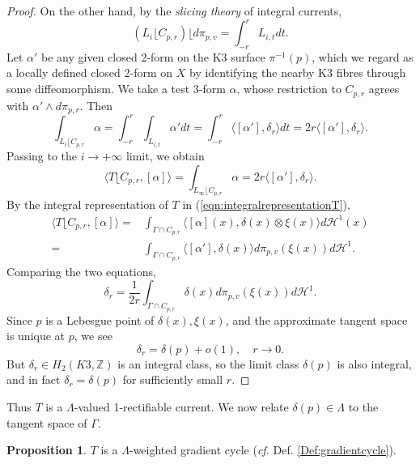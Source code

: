\documentclass{article}
\theoremstyle{definition}
\newtheorem{prop}[thm]{Proposition}
\newcommand{\cf}{\emph{cf.} }
\newcommand{\Z}{\mathbb{Z}}
\begin{document}
\begin{proof}
		On the other hand, by the \emph{slicing theory} of integral currents,
		\[
		(L_i \lfloor  C_{p,r} )  \lfloor  d\pi_{p,v}     = \int_{-r}^{r} 	L_{i,t} dt .
		\]
		Let $\alpha'$ be any given closed 2-form on the K3 surface $\pi^{-1}(p)$, which we regard as a locally defined closed 2-form  on $X$ by identifying the nearby K3 fibres through some diffeomorphism.
		We take a test 3-form $\alpha$, whose restriction to $C_{p,r}$ agrees with $\alpha'\wedge d\pi_{p,r}$. Then 
		\[
		\int_{L_i  \lfloor  C_{p,r}    }   \alpha =  \int_{-r}^{r} 	\int_{L_{i,t} } \alpha' dt = \int_{-r}^{r} \langle [\alpha'], \delta_r\rangle  dt = 2r  \langle [\alpha'], \delta_r\rangle.
		\]
		Passing to the $i\to +\infty$ limit, we obtain
		\[
	\langle  T  \lfloor  C_{p,r}   ,   [ \alpha ]	\rangle =  \int_{ L_\infty  \lfloor  C_{p,r}    }   \alpha  = 2r  \langle [\alpha'], \delta_r\rangle.
		\]
		By the integral representation of $T$ in (\ref{eqn:integralrepresentationT}),
		\[
		\begin{split}
				\langle T \lfloor  C_{p,r} , [\alpha]\rangle = & \int_{\Gamma \cap C_{p,r}  }  \langle [\alpha](x), \delta(x)\otimes  \xi(x)\rangle  d\mathcal{H}^1(x)
				\\
				=&  \int_{  \Gamma \cap C_{p,r}  }  \langle [\alpha'], \delta(x)\rangle  d\pi_{p,v}(\xi(x)) d\mathcal{H}^1.
		\end{split}
		\]
		Comparing the two equations,
		\[
		\delta_r= \frac{1}{2r} \int_{  \Gamma \cap C_{p,r}  }  \delta(x)   d\pi_{p,v}(\xi(x)) d\mathcal{H}^1.
		\]
	Since $p$ is a Lebesgue point of $\delta(x), \xi(x)$, and the approximate tangent space is unique at $p$, we see
	\[
	\delta_r= \delta(p) +o(1),\quad r\to 0.
	\]
		But $\delta_r\in H_2(K3,\Z)$ is an integral class, so the limit class $\delta(p)$ is also integral, and in fact $\delta_r=\delta(p)$ for sufficiently small $r$.
		\end{proof}
		
		
		
		
		Thus $T$ is a $\Lambda$-valued 1-rectifiable current. We now relate $\delta(p)\in \Lambda$ to the tangent space of $\Gamma$.
		
		
	
		
		
		\begin{prop}\label{prop:gradientcycle}
			$T$ is a $\Lambda$-weighted gradient cycle (\cf Def. \ref{Def:gradientcycle}).
		\end{prop}
		
		
		
\end{document}
